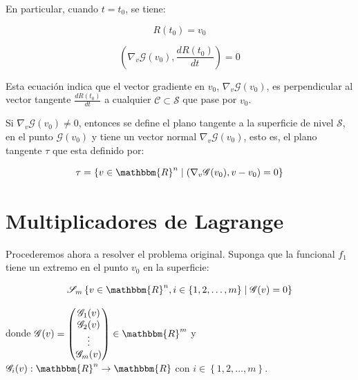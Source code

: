         En particular, cuando $t = t_0$, se tiene:

        \begin{equation*}
            R(t_0) = v_0
        \end{equation*}

        \begin{equation*}
            \left( \nabla_v \mathscr{G}(v_0), \frac{dR(t_0)}{dt} \right) = 0
        \end{equation*}

        Esta ecuación indica que el vector gradiente en $v_0$, $\nabla_v \mathscr{G}(v_0)$,  es perpendicular al vector tangente $\frac{dR(t_0)}{dt}$ a cualquier $\mathscr{C} \subset \mathscr{S}$ que pase por $v_0$.



        Si $\nabla_v \mathscr{G}(v_0) \ne 0$, entonces se define el plano tangente a la superficie de nivel $\mathscr{S}$, en el punto $\mathscr{G}(v_0)$ y tiene un vector normal $\nabla_v \mathscr{G}(v_0)$, esto es, el plano tangente $\tau$ que esta definido por:

        \begin{equation}
            \tau = \left\{ v \in \mathbbm{R}^n \mid \left( \nabla_v \mathscr{G}(v_0), v - v_0 \right) = 0 \right\}
        \end{equation}

        \newpage
        \section{Multiplicadores de Lagrange}

        Procederemos ahora a resolver el problema original. Suponga que la funcional $f_1$ tiene un extremo en el punto $v_0$ en la superficie:

        \begin{equation}
            \mathscr{S}_m \left\{ v \in \mathbbm{R}^n, i \in \left\{ 1, 2, \dots, m \right\} \mid \mathscr{G}(v) = 0 \right\}
        \end{equation}

        donde $\mathscr{G}(v) = \begin{pmatrix} \mathscr{G}_1(v) \\ \mathscr{G}_2(v) \\ \vdots \\ \mathscr{G}_m(v) \end{pmatrix} \in \mathbbm{R}^m$
            y $\mathscr{G}_i(v):\mathbbm{R}^n \to \mathbbm{R}$
            con $i \in \left\{ 1,2,\dots,m \right\}$.

